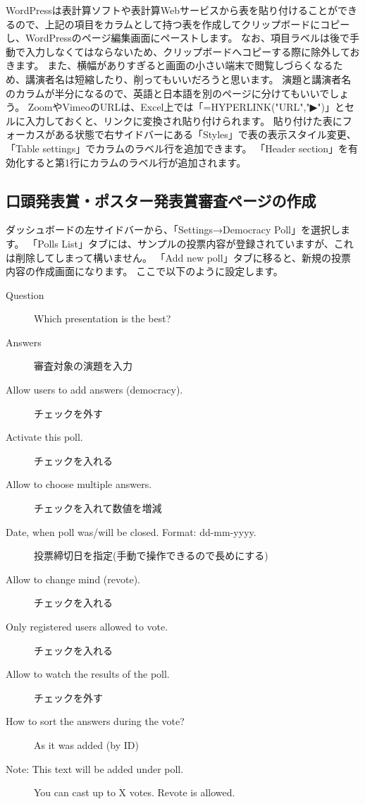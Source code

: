 \documentclass[titlepage,10pt,a4paper,uplatex]{jsbook}
\begin{document}
WordPressは表計算ソフトや表計算Webサービスから表を貼り付けることができるので、上記の項目をカラムとして持つ表を作成してクリップボードにコピーし、WordPressのページ編集画面にペーストします。
なお、項目ラベルは後で手動で入力しなくてはならないため、クリップボードへコピーする際に除外しておきます。
また、横幅がありすぎると画面の小さい端末で閲覧しづらくなるため、講演者名は短縮したり、削ってもいいだろうと思います。
演題と講演者名のカラムが半分になるので、英語と日本語を別のページに分けてもいいでしょう。
ZoomやVimeoのURLは、Excel上では「=HYPERLINK("URL","▶")」とセルに入力しておくと、リンクに変換され貼り付けられます。
貼り付けた表にフォーカスがある状態で右サイドバーにある「Styles」で表の表示スタイル変更、「Table settings」でカラムのラベル行を追加できます。
「Header section」を有効化すると第1行にカラムのラベル行が追加されます。

\subsection{口頭発表賞・ポスター発表賞審査ページの作成}

ダッシュボードの左サイドバーから、「Settings→Democracy Poll」を選択します。
「Polls List」タブには、サンプルの投票内容が登録されていますが、これは削除してしまって構いません。
「Add new poll」タブに移ると、新規の投票内容の作成画面になります。
ここで以下のように設定します。

\begin{description}
\item[Question] Which presentation is the best?
\item[Answers] 審査対象の演題を入力
\item[Allow users to add answers (democracy).] チェックを外す
\item[Activate this poll.] チェックを入れる
\item[Allow to choose multiple answers.] チェックを入れて数値を増減
\item[Date, when poll was/will be closed. Format: dd-mm-yyyy.] 投票締切日を指定(手動で操作できるので長めにする)
\item[Allow to change mind (revote).] チェックを入れる
\item[Only registered users allowed to vote.] チェックを入れる
\item[Allow to watch the results of the poll.] チェックを外す
\item[How to sort the answers during the vote?] As it was added (by ID)
\item[Note: This text will be added under poll.] You can cast up to X votes. Revote is allowed.
\end{description}
\end{document}
